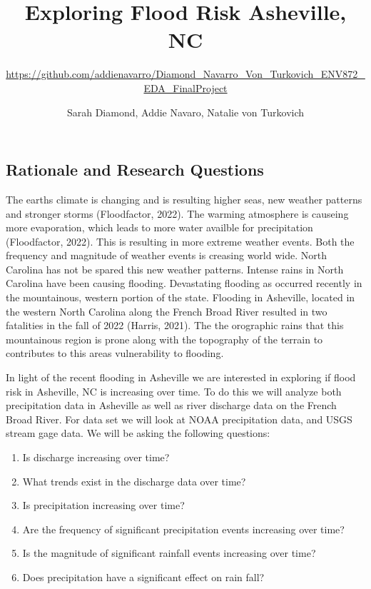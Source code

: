 \documentclass[
]{article}
\title{\textbf{Exploring Flood Risk Asheville, NC}}
\subtitle{\url{https://github.com/addienavarro/Diamond_Navarro_Von_Turkovich_ENV872_EDA_FinalProject}}
\author{Sarah Diamond, Addie Navaro, Natalie von Turkovich}
\date{}
\begin{document}
\maketitle

\newpage
\tableofcontents 
\newpage
\listoftables 
\newpage
\listoffigures 
\newpage

\hypertarget{rationale-and-research-questions}{%
\subsection{\texorpdfstring{\textbf{Rationale and Research
Questions}}{Rationale and Research Questions}}\label{rationale-and-research-questions}}

The earths climate is changing and is resulting higher seas, new weather
patterns and stronger storms (Floodfactor, 2022). The warming atmosphere
is causeing more evaporation, which leads to more water availble for
precipitation (Floodfactor, 2022). This is resulting in more extreme
weather events. Both the frequency and magnitude of weather events is
creasing world wide. North Carolina has not be spared this new weather
patterns. Intense rains in North Carolina have been causing flooding.
Devastating flooding as occurred recently in the mountainous, western
portion of the state. Flooding in Asheville, located in the western
North Carolina along the French Broad River resulted in two fatalities
in the fall of 2022 (Harris, 2021). The the orographic rains that this
mountainous region is prone along with the topography of the terrain to
contributes to this areas vulnerability to flooding.

In light of the recent flooding in Asheville we are interested in
exploring if flood risk in Asheville, NC is increasing over time. To do
this we will analyze both precipitation data in Asheville as well as
river discharge data on the French Broad River. For data set we will
look at NOAA precipitation data, and USGS stream gage data. We will be
asking the following questions:

\begin{enumerate}
\def\labelenumi{\arabic{enumi}.}
\item
  Is discharge increasing over time?
\item
  What trends exist in the discharge data over time?
\item
  Is precipitation increasing over time?
\item
  Are the frequency of significant precipitation events increasing over
  time?
\item
  Is the magnitude of significant rainfall events increasing over time?
\item
  Does precipitation have a significant effect on rain fall?
\end{enumerate}
\end{document}
